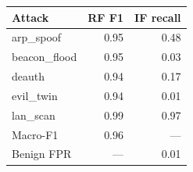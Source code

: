 \begin{tabular}{lrr}\toprule
 Attack & RF F1 & IF recall \\\midrule
arp\_spoof & 0.95 & 0.48 \\
beacon\_flood & 0.95 & 0.03 \\
deauth & 0.94 & 0.17 \\
evil\_twin & 0.94 & 0.01 \\
lan\_scan & 0.99 & 0.97 \\
\midrule Macro-F1 & 0.96 & --- \\
Benign FPR & --- & 0.01 \\
\bottomrule\end{tabular}
